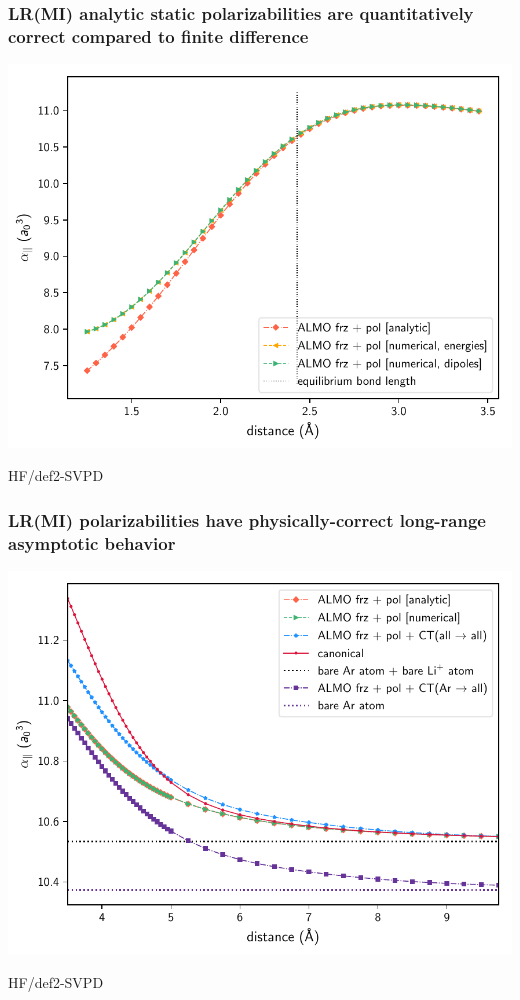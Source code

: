 \documentclass[%
    xcolor=usenames,dvipsnames,svgnames%
]{beamer}
\newenvironment{nscenter}
 {\parskip=0pt\par\nopagebreak\centering}
 {\par\noindent\ignorespacesafterend}
\begin{document}
\begin{frame}
  \frametitle{LR(MI) analytic static polarizabilities are quantitatively correct compared to finite difference}
  \begin{nscenter}
    \includegraphics[scale=0.65]{./figures/almo_analytic_vs_numerical_onaxis_projected_short_def2-SVPD.pdf}
  \end{nscenter}
  {\tiny HF/def2-SVPD}
\end{frame}

\begin{frame}
  \frametitle{LR(MI) polarizabilities have physically-correct long-range asymptotic behavior}
  \begin{nscenter}
    \includegraphics[scale=0.65]{./figures/long_convergence_behavior_onaxis_def2-SVPD.pdf}
  \end{nscenter}
  {\tiny HF/def2-SVPD}
\end{frame}
\end{document}
